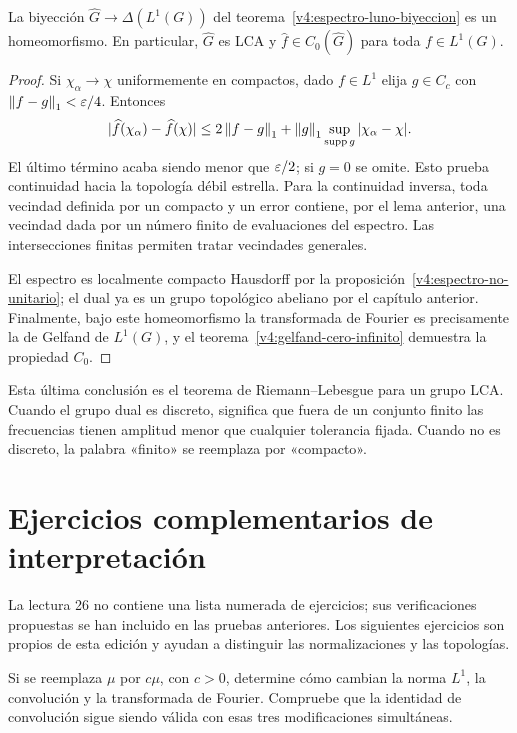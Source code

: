 \begin{teorema}\label{v4:dual-espectro-homeomorfismo}
La biyección $\widehat G\to\Delta(L^1(G))$ del teorema~\ref{v4:espectro-luno-biyeccion} es un homeomorfismo. En particular, $\widehat G$ es LCA y $\widehat f\in C_0(\widehat G)$ para toda $f\in L^1(G)$.
\end{teorema}
\begin{proof}
Si $\chi_\alpha\to\chi$ uniformemente en compactos, dado $f\in L^1$ elija $g\in C_c$ con $\left\lVert f-g\right\rVert_1<\varepsilon/4$. Entonces
\[
 |\widehat f(\chi_\alpha)-\widehat f(\chi)|
 \le2\left\lVert f-g\right\rVert_1+\left\lVert g\right\rVert_1\sup_{\operatorname{supp} g}|\chi_\alpha-\chi|.
\]
El último término acaba siendo menor que $\varepsilon/2$; si $g=0$ se omite. Esto prueba continuidad hacia la topología débil estrella. Para la continuidad inversa, toda vecindad definida por un compacto y un error contiene, por el lema anterior, una vecindad dada por un número finito de evaluaciones del espectro. Las intersecciones finitas permiten tratar vecindades generales.

El espectro es localmente compacto Hausdorff por la proposición~\ref{v4:espectro-no-unitario}; el dual ya es un grupo topológico abeliano por el capítulo anterior. Finalmente, bajo este homeomorfismo la transformada de Fourier es precisamente la de Gelfand de $L^1(G)$, y el teorema~\ref{v4:gelfand-cero-infinito} demuestra la propiedad $C_0$.
\end{proof}

Esta última conclusión es el teorema de Riemann--Lebesgue para un grupo LCA. Cuando el grupo dual es discreto, significa que fuera de un conjunto finito las frecuencias tienen amplitud menor que cualquier tolerancia fijada. Cuando no es discreto, la palabra «finito» se reemplaza por «compacto».

\section{Ejercicios complementarios de interpretación}
La lectura 26 no contiene una lista numerada de ejercicios; sus verificaciones propuestas se han incluido en las pruebas anteriores. Los siguientes ejercicios son propios de esta edición y ayudan a distinguir las normalizaciones y las topologías.

\begin{ejercicio}\label{ej:v4-ampl-15-1}
Si se reemplaza $\mu$ por $c\mu$, con $c>0$, determine cómo cambian la norma $L^1$, la convolución y la transformada de Fourier. Compruebe que la identidad de convolución sigue siendo válida con esas tres modificaciones simultáneas.
\end{ejercicio}


